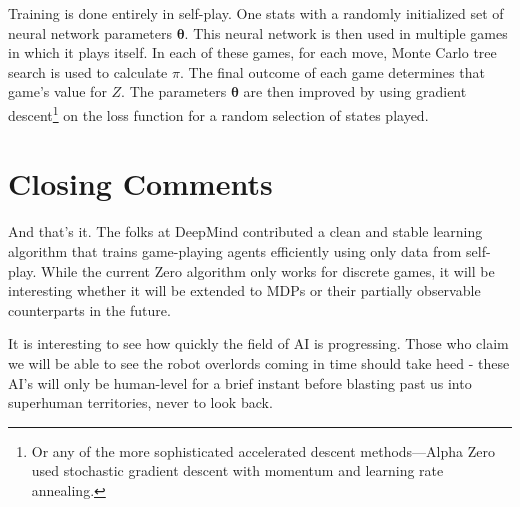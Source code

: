 \documentclass[10pt]{article}
\newcommand{\vect}[1]{\boldsymbol{\mathbf{#1}}}
\begin{document}
Training is done entirely in self-play.
One stats with a randomly initialized set of neural network parameters $\vect \theta$.
This neural network is then used in multiple games in which it plays itself.
In each of these games, for each move, Monte Carlo tree search is used to calculate $\pi$.
The final outcome of each game determines that game's value for $Z$.
The parameters $\vect \theta$ are then improved by using gradient descent\footnote{Or any of the more sophisticated accelerated descent methods---Alpha Zero used stochastic gradient descent with momentum and learning rate annealing.} on the loss function for a random selection of states played.

\section*{Closing Comments}

And that's it. The folks at DeepMind contributed a clean and stable learning algorithm that trains game-playing agents efficiently using only data from self-play. While the current Zero algorithm only works for discrete games, it will be interesting whether it will be extended to MDPs or their partially observable counterparts in the future.

It is interesting to see how quickly the field of AI is progressing. Those who claim we will be able to see the robot overlords coming in time should take heed - these AI's will only be human-level for a brief instant before blasting past us into superhuman territories, never to look back.
\end{document}
